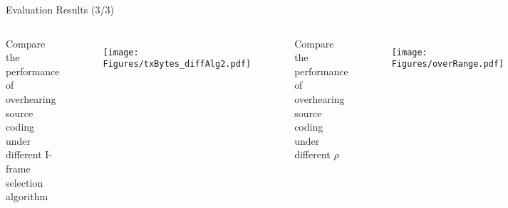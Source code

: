 \begin{frame}{Evaluation Results (3/3)}
\begin{columns}
\begin{itemize}
	\myItem Compare the performance of overhearing source coding under different I-frame selection algorithm
\end{itemize}
\begin{figure}
\centering
\texttt{[image: Figures/txBytes\_diffAlg2.pdf]}
\end{figure}
%
\begin{itemize}
	\myItem Compare the performance of overhearing source coding under different $\rho$
\end{itemize}
\begin{figure}
\centering
\texttt{[image: Figures/overRange.pdf]}
\end{figure}
\end{columns}
%
\end{frame}